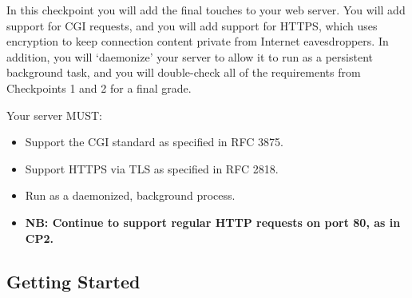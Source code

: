 In this checkpoint you will add the final touches to your web server. 
You will add support for CGI requests, and you will add support for HTTPS, which uses encryption to keep connection content private from Internet eavesdroppers.
In addition, you will `daemonize' your server to allow it to run as a persistent background task, and you will double-check all of the requirements from Checkpoints 1 and 2 for a final grade.

\vspace{5pt}
\noindent Your server MUST:
\begin{itemize}
  \item Support the CGI standard as specified in RFC 3875.
  \item Support HTTPS via TLS as specified in RFC 2818.
  \item Run as a daemonized, background process.
  \item {\bf NB: Continue to support regular HTTP requests on port 80, as in CP2.}
\end{itemize}

\subsection{Getting Started}


